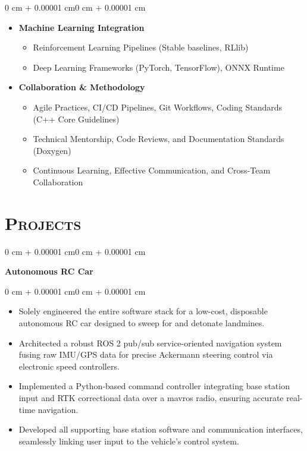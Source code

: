\documentclass[10pt, letterpaper]{article}
\newenvironment{highlights}{
    \begin{itemize}[
        topsep=0.10 cm,
        parsep=0.10 cm,
        partopsep=0pt,
        itemsep=0pt,
        leftmargin=0.4 cm + 10pt
    ]
}{
    \end{itemize}
}
\newenvironment{onecolentry}{
    \begin{adjustwidth}{0 cm + 0.00001 cm}{0 cm + 0.00001 cm}
}{
    \end{adjustwidth}
}
\begin{document}
\begin{onecolentry}
\begin{itemize}[leftmargin=0.4 cm]
        \item \textbf{Machine Learning Integration}
        \begin{itemize}
            \item Reinforcement Learning Pipelines (Stable baselines, RLlib)
            \item Deep Learning Frameworks (PyTorch, TensorFlow), ONNX Runtime
        \end{itemize}

        \item \textbf{Collaboration \& Methodology}
        \begin{itemize}
            \item Agile Practices, CI/CD Pipelines, Git Workflows, Coding Standards (C++ Core Guidelines)
            \item Technical Mentorship, Code Reviews, and Documentation Standards (Doxygen)
            \item Continuous Learning, Effective Communication, and Cross-Team Collaboration
        \end{itemize}
    \end{itemize}
\end{onecolentry}


\section{\scshape Projects}

\vspace{0.2 cm}

\begin{onecolentry}
    \textbf{Autonomous RC Car}
\end{onecolentry}

\vspace{0.10 cm}
\begin{onecolentry}
    \begin{highlights}
        \item Solely engineered the entire software stack for a low-cost, disposable autonomous RC car designed to sweep for and detonate landmines.
        \item Architected a robust ROS 2 pub/sub service-oriented navigation system fusing raw IMU/GPS data for precise Ackermann steering control via electronic speed controllers.
        \item Implemented a Python-based command controller integrating base station input and RTK correctional data over a mavros radio, ensuring accurate real-time navigation.
        \item Developed all supporting base station software and communication interfaces, seamlessly linking user input to the vehicle’s control system.
    \end{highlights}
\end{onecolentry}
\end{document}
